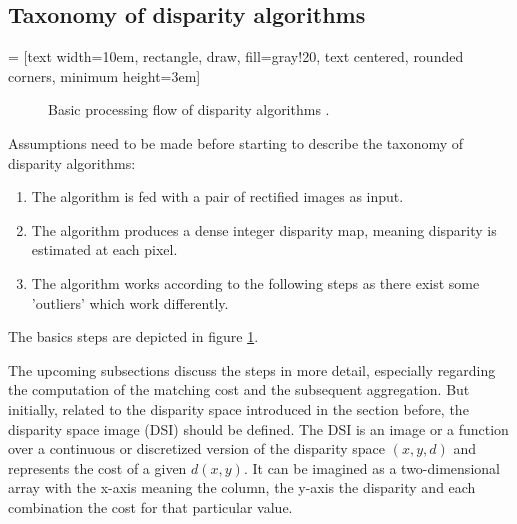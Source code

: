 \subsection*{Taxonomy of disparity algorithms}

 = [text width=10em, rectangle, draw, fill=gray!20, text centered, rounded corners, minimum height=3em]
\begin{figure}[h!]
  \centering
  \caption{Basic processing flow of disparity algorithms \citep{cyganek2011introduction, scharstein2002taxonomy}.}
  \label{fig:disparity-flow}
\end{figure}

\newpage

\noindent Assumptions need to be made before starting to describe the taxonomy of disparity algorithms:

\begin{enumerate}
  \item The algorithm is fed with a pair of rectified images as input.
  \item The algorithm produces a dense integer disparity map, meaning disparity is estimated at each pixel.
  \item The algorithm works according to the following steps as there exist some 'outliers' which work differently.
\end{enumerate}

\noindent The basics steps are depicted in figure \ref{fig:disparity-flow}.

\noindent The upcoming subsections discuss the steps in more detail, especially regarding the computation of the matching cost and the subsequent aggregation.
But initially, related to the disparity space introduced in the section before, the disparity space image (DSI) should be defined.
The DSI is an image or a function over a continuous or discretized version of the disparity space $(x,y,d)$ and represents the cost of a given $d(x,y)$.
It can be imagined as a two-dimensional array with the x-axis meaning the column, the y-axis the disparity and each combination the cost for that particular value.

